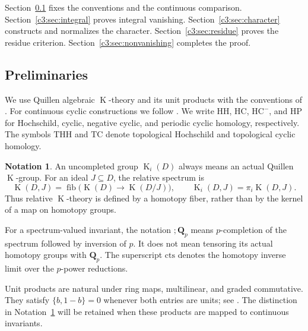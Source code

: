 \documentclass[11pt,a4paper]{amsart}
\numberwithin{equation}{section}
\theoremstyle{definition}
\newtheorem{notation}[theorem]{Notation}
\theoremstyle{remark}
\newcommand{\CthreeQ}{\mathbf{Q}}
\newcommand{\Cthreects}{\mathrm{cts}}
\DeclareMathOperator{\CthreeK}{K}
\DeclareMathOperator{\Cthreefib}{fib}
\begin{document}
Section~\ref{c3:sec:preliminaries} fixes the conventions and the continuous
comparison. Section~\ref{c3:sec:integral} proves integral vanishing.
Section~\ref{c3:sec:character} constructs and normalizes the character.
Section~\ref{c3:sec:residue} proves the residue criterion.
Section~\ref{c3:sec:nonvanishing} completes the proof.







\subsection{Preliminaries}\label{c3:sec:preliminaries}

We use Quillen algebraic $\CthreeK$-theory and its unit products with the
conventions of \cite{Quillen,Weibel}.
For continuous cyclic constructions we follow
\cite[Definition~4.1 and Proposition~4.2]{AMMN}.
We write $\mathrm{HH}$, $\mathrm{HC}$, $\mathrm{HC}^{-}$, and $\mathrm{HP}$ for Hochschild, cyclic, negative cyclic, and periodic cyclic homology, respectively. The symbols $\mathrm{THH}$ and $\mathrm{TC}$ denote topological Hochschild and topological cyclic homology.

\begin{notation}\label{c3:notation:k-theory}
An uncompleted group $\CthreeK_i(D)$ always means an actual Quillen
$\CthreeK$-group.
For an ideal $J\subseteq D$, the relative spectrum is
\[
 \CthreeK(D,J)=\Cthreefib\bigl(\CthreeK(D)\longrightarrow\CthreeK(D/J)\bigr),
 \qquad
 \CthreeK_i(D,J)=\pi_i\CthreeK(D,J).
\]
Thus relative $\CthreeK$-theory is defined by a homotopy fiber, rather than
by the kernel of a map on homotopy groups.

For a spectrum-valued invariant, the notation $;\CthreeQ_p$ means
$p$-completion of the spectrum followed by inversion of $p$.
It does not mean tensoring its actual homotopy groups with $\CthreeQ_p$.
The superscript $\Cthreects$ denotes the homotopy inverse limit over
the $p$-power reductions.
\end{notation}

Unit products are natural under ring maps, multilinear, and graded
commutative. They satisfy $\{b,1-b\}=0$ whenever both entries are units;
see \cite[III, Lemma~5.10.2, Definition~5.11, and the unit-product
discussion following Theorem~5.11.1]{Weibel}.
The distinction in Notation~\ref{c3:notation:k-theory} will be retained
when these products are mapped to continuous invariants.
\end{document}
